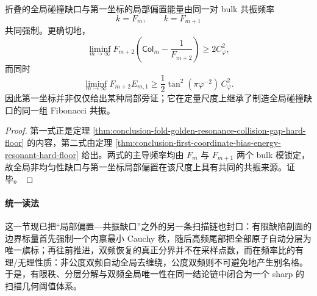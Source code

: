 \begin{corollary}[全局碰撞缺口与第一坐标偏置的同源共振强制]\label{cor:conclusion-first-coordinate-bias-and-global-gap-common-resonant-origin}
折叠的全局碰撞缺口与第一坐标的局部偏置能量由同一对 bulk 共振频率
\[
k=F_m,
\qquad
k=F_{m+1}
\]
共同强制。更确切地，
\[
\liminf_{m\to\infty}F_{m+2}\left(\mathsf{Col}_m-\frac{1}{F_{m+2}}\right)\ge 2C_\varphi^2,
\]
而同时
\[
\liminf_{m\to\infty}F_{m+2}E_{m,1}
\ge
\frac12\tan^2(\pi\varphi^{-2})\,C_\varphi^2.
\]
因此第一坐标并非仅仅给出某种局部旁证；它在定量尺度上继承了制造全局碰撞缺口的同一组 Fibonacci 共振。
\end{corollary}
\begin{proof}
第一式正是定理 \ref{thm:conclusion-fold-golden-resonance-collision-gap-hard-floor} 的内容，第二式由定理 \ref{thm:conclusion-first-coordinate-bias-energy-resonant-hard-floor} 给出。两式的主导频率均由 \(F_m\) 与 \(F_{m+1}\) 两个 bulk 模锁定，故全局非均匀性缺口与第一坐标局部偏置在该尺度上具有共同的共振来源。证毕。
\end{proof}



\paragraph{统一读法}
这一节现已把“局部偏置—共振缺口”之外的另一条扫描链也封口：有限缺陷剖面的边界标量首先强制一个内禀最小 Cauchy 秩，随后高频尾部把全部原子自动分层为唯一旗标；再往前推进，双频恢复的真正分界并不在采样点数，而在频率比的有理/无理性质：非公度双频自动全局去缠绕，公度双频则不可避免地产生别名格。于是，有限秩、分层分解与双频全局唯一性在同一结论链中闭合为一个 sharp 的扫描几何阈值体系。

\endinput
